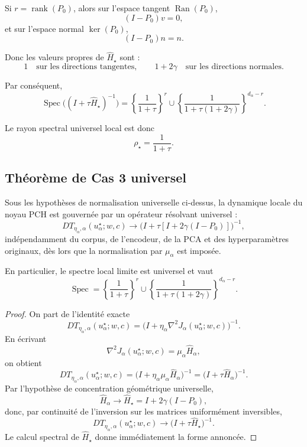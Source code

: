 Si \(r=\operatorname{rank}(P_0)\), alors sur l'espace tangent \(\operatorname{Ran}(P_0)\),
\[
(I-P_0)v=0,
\]
et sur l'espace normal \(\ker(P_0)\),
\[
(I-P_0)n=n.
\]

Donc les valeurs propres de \(\widehat H_\star\) sont :
\[
1 \quad\text{sur les directions tangentes},
\qquad
1+2\gamma \quad\text{sur les directions normales}.
\]

Par conséquent,
\[
\operatorname{Spec}\bigl((I+\tau \widehat H_\star)^{-1}\bigr)
=
\left\{
\frac{1}{1+\tau}
\right\}^{r}
\cup
\left\{
\frac{1}{1+\tau(1+2\gamma)}
\right\}^{d_\alpha-r}.
\]

Le rayon spectral universel local est donc
\[
\rho_\star = \frac{1}{1+\tau}.
\]

\subsection{Théorème de Cas 3 universel}

\begin{theorem}
Sous les hypothèses de normalisation universelle ci-dessus,
la dynamique locale du noyau PCH est gouvernée par un opérateur résolvant universel :
\[
DT_{\eta_\alpha,\alpha}(u_\alpha^\star;w,c)
\to
\bigl(I+\tau[I+2\gamma(I-P_0)]\bigr)^{-1},
\]
indépendamment du corpus, de l'encodeur, de la PCA et des hyperparamètres originaux,
dès lors que la normalisation par \(\mu_\alpha\) est imposée.

En particulier, le spectre local limite est universel et vaut
\[
\operatorname{Spec}
=
\left\{
\frac{1}{1+\tau}
\right\}^{r}
\cup
\left\{
\frac{1}{1+\tau(1+2\gamma)}
\right\}^{d_\alpha-r}.
\]
\end{theorem}

\begin{proof}
On part de l'identité exacte
\[
DT_{\eta_\alpha,\alpha}(u_\alpha^\star;w,c)
=
\bigl(I+\eta_\alpha \nabla^2 J_\alpha(u_\alpha^\star;w,c)\bigr)^{-1}.
\]
En écrivant
\[
\nabla^2 J_\alpha(u_\alpha^\star;w,c)
=
\mu_\alpha \widehat H_\alpha,
\]
on obtient
\[
DT_{\eta_\alpha,\alpha}(u_\alpha^\star;w,c)
=
\bigl(I+\eta_\alpha\mu_\alpha \widehat H_\alpha\bigr)^{-1}
=
\bigl(I+\tau \widehat H_\alpha\bigr)^{-1}.
\]
Par l'hypothèse de concentration géométrique universelle,
\[
\widehat H_\alpha \to \widehat H_\star = I+2\gamma(I-P_0),
\]
donc, par continuité de l'inversion sur les matrices uniformément inversibles,
\[
DT_{\eta_\alpha,\alpha}(u_\alpha^\star;w,c)
\to
\bigl(I+\tau \widehat H_\star\bigr)^{-1}.
\]
Le calcul spectral de \(\widehat H_\star\) donne immédiatement la forme annoncée.
\end{proof}

